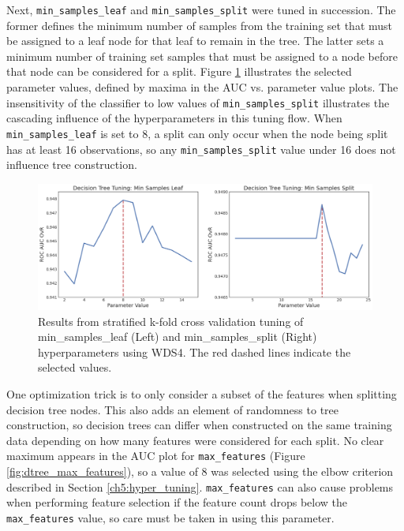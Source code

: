 Next, \verb|min_samples_leaf| and \verb|min_samples_split| were tuned in succession. The former defines the minimum number of samples from the training set that must be assigned to a leaf node for that leaf to remain in the tree. The latter sets a minimum number of training set samples that must be assigned to a node before that node can be considered for a split. Figure \ref{fig:dtree_min_samples} illustrates the selected parameter values, defined by maxima in the AUC vs. parameter value plots. The insensitivity of the classifier to low values of \verb|min_samples_split| illustrates the cascading influence of the hyperparameters in this tuning flow. When \verb|min_samples_leaf| is set to 8, a split can only occur when the node being split has at least 16 observations, so any \verb|min_samples_split| value under 16 does not influence tree construction. 

\begin{figure}[!htp]
\centering
\includegraphics[width=\textwidth]{templates/images/Figure-DT_tuning_min_samp_leaf_split.png}
\caption[Decision tree min samples tuning]{Results from stratified k-fold cross validation tuning of min\_samples\_leaf (Left) and min\_samples\_split (Right) hyperparameters using WDS4. The red dashed lines indicate the selected values.}
\label{fig:dtree_min_samples}
\end{figure}

One optimization trick is to only consider a subset of the features when splitting decision tree nodes. This also adds an element of randomness to tree construction, so decision trees can differ when constructed on the same training data depending on how many features were considered for each split. No clear maximum appears in the AUC plot for \verb|max_features| (Figure \ref{fig:dtree_max_features}), so a value of 8 was selected using the elbow criterion described in Section \ref{ch5:hyper_tuning}. \verb|max_features| can also cause problems when performing feature selection if the feature count drops  below the \verb|max_features| value, so care must be taken in using this parameter.


